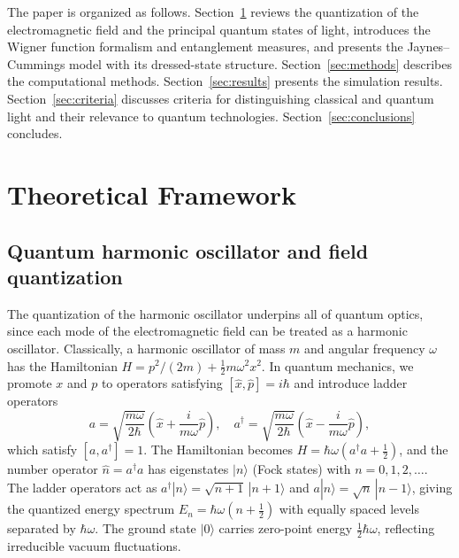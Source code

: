 \documentclass[%
 reprint,
 amsmath,amssymb,
 aps,
]{revtex4-2}
\begin{document}
The paper is organized as follows. Section~\ref{sec:theory} reviews the quantization of the electromagnetic field and the principal quantum states of light, introduces the Wigner function formalism and entanglement measures, and presents the Jaynes--Cummings model with its dressed-state structure. Section~\ref{sec:methods} describes the computational methods. Section~\ref{sec:results} presents the simulation results. Section~\ref{sec:criteria} discusses criteria for distinguishing classical and quantum light and their relevance to quantum technologies. Section~\ref{sec:conclusions} concludes.


\section{Theoretical Framework}
\label{sec:theory}

\subsection{Quantum harmonic oscillator and field quantization}
\label{sec:quantization}

The quantization of the harmonic oscillator underpins all of quantum optics, since each mode of the electromagnetic field can be treated as a harmonic oscillator. Classically, a harmonic oscillator of mass $m$ and angular frequency $\omega$ has the Hamiltonian $H = p^2/(2m) + \tfrac{1}{2}m\omega^2 x^2$. In quantum mechanics, we promote $x$ and $p$ to operators satisfying $[\hat{x}, \hat{p}] = i\hbar$ and introduce ladder operators
\begin{equation}
a = \sqrt{\frac{m\omega}{2\hbar}} \left( \hat{x} + \frac{i}{m\omega} \hat{p} \right), \quad
a^\dagger = \sqrt{\frac{m\omega}{2\hbar}} \left( \hat{x} - \frac{i}{m\omega} \hat{p} \right),
\label{eq:ladder}
\end{equation}
which satisfy $[a, a^\dagger] = 1$. The Hamiltonian becomes $H = \hbar\omega(a^\dagger a + \tfrac{1}{2})$, and the number operator $\hat{n} = a^\dagger a$ has eigenstates $|n\rangle$ (Fock states) with $n = 0, 1, 2, \ldots$. The ladder operators act as $a^\dagger|n\rangle = \sqrt{n+1}\,|n+1\rangle$ and $a|n\rangle = \sqrt{n}\,|n-1\rangle$, giving the quantized energy spectrum $E_n = \hbar\omega(n + \tfrac{1}{2})$ with equally spaced levels separated by $\hbar\omega$. The ground state $|0\rangle$ carries zero-point energy $\tfrac{1}{2}\hbar\omega$, reflecting irreducible vacuum fluctuations.
\end{document}
